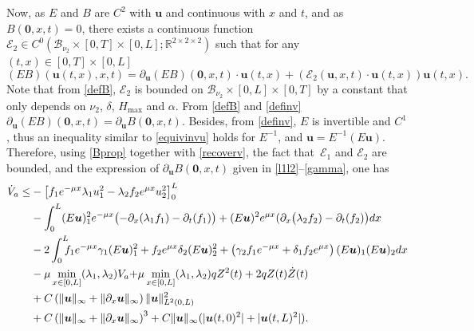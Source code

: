 Now, as $E$ and $B$ are $C^{2}$ with $\boldsymbol{u}$ and continuous with $x$ and $t$, and as $B(\boldsymbol{0},x,t)=0$, there exists a continuous function {$\mathcal{E}_{2}\in C^{0}(\mathcal{B}_{\nu_{2}}\times[0,T]\times[0,L];\mathbb{R}^{2\times 2\times 2})$} such that for any $(t,x)\in[0,T]\times[0,L]$
\begin{equation}
(EB)(\boldsymbol{u}(t,x),x,t)=\partial_{\boldsymbol{u}}(EB)(\boldsymbol{0},x,t)\cdot\boldsymbol{u}(t,x)+(\mathcal{E}_{2}(\boldsymbol{u},x,t)\cdot\boldsymbol{u}(t,x))\boldsymbol{u}(t,x).
\label{Bprop}
\end{equation}
Note that from \eqref{defB}, $\mathcal{E}_{2}$ is bounded on $\mathcal{B}_{\nu_{2}}\times[0,L]\times[0,T]$ by a constant that only depends on $\nu_{2}$, $\delta$, $H_{\max}$ and $\alpha$. From \eqref{defB} and \eqref{definv}
$\partial_{\boldsymbol{u}}(EB)(\boldsymbol{0},x,t)=\partial_{\boldsymbol{u}}B(\boldsymbol{0},x,t)$. Besides, from \eqref{definv}, $E$ is invertible and $C^{1}$, thus an inequality similar to
\eqref{equivinvu}
holds for $E^{-1}$, and $\boldsymbol{u}=E^{-1}(E\boldsymbol{u})$.
Therefore, using \eqref{Bprop} together with \eqref{recoverv}, {the fact that~$\mathcal{E}_{1}$ and $\mathcal{E}_{2}$ are bounded,} and the expression of $\partial_{\boldsymbol{u}}B(\boldsymbol{0},x,t)$ given in {\eqref{l1l2}}--\eqref{gamma}, one has
\begin{align*}
\dot V_{a}\leq& -\left[f_{1}e^{-\mu x}\lambda_{1}u_{1}^{2}-\lambda_{2}f_{2}e^{\mu x}u_{2}^{2}\right]_{0}^{L}\\
&-\int_{0}^{L}(E\boldsymbol{u})_{1}^{2}e^{-\mu x}\bigl(-\partial_{x}(\lambda_{1}f_{1})-\partial_{t}(f_{1})\bigr)+(E\boldsymbol{u})^{2}e^{\mu x}(\partial_{x}\bigl(\lambda_{2}f_{2})-\partial_{t}(f_{2})\bigr)dx\\
&-2\int_{0}^{L}\hspace*{-2mm}f_{1}e^{-\mu x}\gamma_{1}(E\boldsymbol{u})_{1}^{2}+f_{2}e^{\mu x}\delta_{2}(E\boldsymbol{u})_{2}^{2}+\left(\gamma_{2}f_{1}e^{-\mu x}+\delta_{1}f_{2}e^{\mu x}\right)(E\boldsymbol{u})_{1}(E\boldsymbol{u})_{2}dx\\
&-\mu\min\limits_{x\in[0,L]}(\lambda_{1},\lambda_{2})V_{a}{+\mu\min\limits_{x\in[0,L]}(\lambda_{1},\lambda_{2})qZ^{2}(t)}
+2qZ(t)\dot Z(t)\\
&+C\left(\lVert \boldsymbol{u}\rVert_{\infty}+\lVert \partial_{x} \boldsymbol{u}\rVert_{\infty}\right)\lVert\boldsymbol{u} \rVert_{L^{2}(0,L)}^{2}\\
&+C\left(\lVert \boldsymbol{u}\rVert_{\infty}+\lVert \partial_{x} \boldsymbol{u}\rVert_{\infty}\right)^{3}+C\lVert \boldsymbol{u}\rVert_{\infty}(|\boldsymbol{u}(t,0)^{2}|+|\boldsymbol{u}(t,L)^{2}|).
\end{align*}
